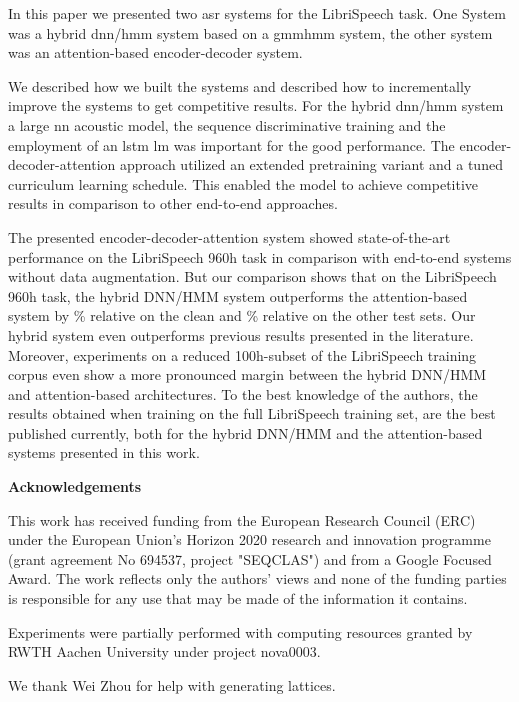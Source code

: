 \documentclass[a4paper]{article}
\def\acknowledgements{\begin{center}
{\bf \large Acknowledgements\vspace{-.5em}\vspace{2pt}}
\end{center}}
\begin{document}
In this paper we presented two \ac{asr} systems for the LibriSpeech task.
One System was a hybrid \ac{dnn}/\ac{hmm} system based on a \ac{gmmhmm} system, the other system was an attention-based encoder-decoder system.\par
We described how we built the systems and described how to incrementally improve the systems to get competitive results.
For the hybrid \ac{dnn}/\ac{hmm} system a large \ac{nn} acoustic model, the sequence discriminative training and the employment of an \ac{lstm} \ac{lm} was important for the good performance.
The encoder-decoder-attention approach utilized an extended pretraining variant and a tuned curriculum learning schedule.
This enabled the model to achieve competitive results in comparison to other end-to-end approaches.

The presented encoder-decoder-attention system showed state-of-the-art performance on the LibriSpeech 960h task in comparison with end-to-end systems without data augmentation.
But our comparison shows that on the LibriSpeech 960h task, the hybrid DNN/HMM system outperforms the attention-based system by \% relative on the clean and \% relative on the other test sets.
Our hybrid system even outperforms previous results presented in the literature.
Moreover, experiments on a reduced 100h-subset of the LibriSpeech training corpus even show a more pronounced margin between the hybrid DNN/HMM and attention-based architectures.
To the best knowledge of the authors, the results obtained when training on the full LibriSpeech training set, are the best published currently, both for the hybrid DNN/HMM and the attention-based systems presented in this work.

\acknowledgements

\begin{footnotesize}

This work has received funding from the European Research Council (ERC)
under the European Union's Horizon 2020 research and innovation programme
(grant agreement No 694537, project "SEQCLAS")
and from a Google Focused Award.
The work reflects only the authors' views and
none of the funding parties is responsible for any
use that may be made of the information it contains.

Experiments were partially performed with computing resources granted by RWTH Aachen University under project nova0003.

We thank Wei Zhou for help with generating lattices.

\end{footnotesize}




\end{document}
